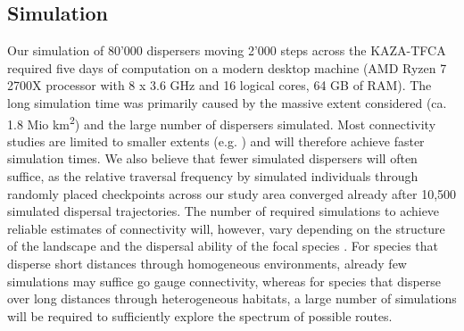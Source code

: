 \documentclass[abstract=on,10pt,a4paper,bibliography=totocnumbered]{article}
\begin{document}
\subsection{Simulation}
Our simulation of 80'000 dispersers moving 2'000 steps across the KAZA-TFCA
required five days of computation on a modern desktop machine (AMD Ryzen 7 2700X
processor with 8 x 3.6 GHz and 16 logical cores, 64 GB of RAM). The long
simulation time was primarily caused by the massive extent considered (ca. 1.8
Mio km\textsuperscript{2}) and the large number of dispersers simulated. Most
connectivity studies are limited to smaller extents (e.g.
\citealp{Kanagaraj.2013, Clark.2015, McClure.2016, Abrahms.2017, Zeller.2020})
and will therefore achieve faster simulation times. We also believe that fewer
simulated dispersers will often suffice, as the relative traversal frequency by
simulated individuals through randomly placed checkpoints across our study area
converged already after 10,500 simulated dispersal trajectories. The number of
required simulations to achieve reliable estimates of connectivity will,
however, vary depending on the structure of the landscape and the dispersal
ability of the focal species \citep{Gustafson.1996}. For species that disperse
short distances through homogeneous environments, already few simulations may
suffice go gauge connectivity, whereas for species that disperse over long
distances through heterogeneous habitats, a large number of simulations will be
required to sufficiently explore the spectrum of possible routes.
\end{document}
